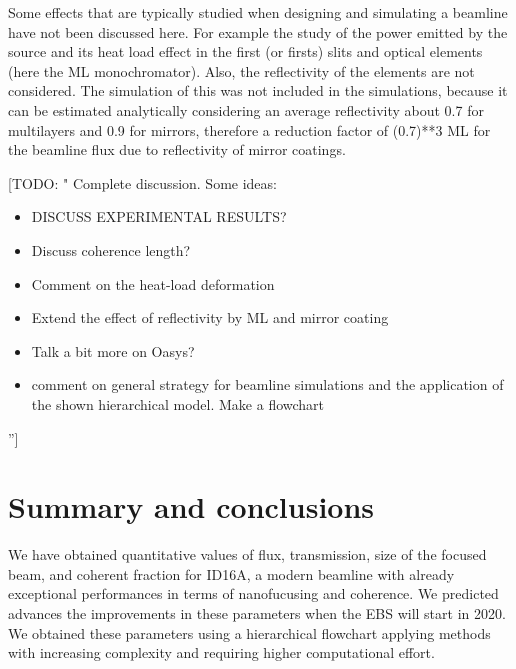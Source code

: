 \documentclass{iucr}              %
\newcommand{\todo}[1]{{\color{red}[TODO: "#1'']}}
\newcommand{\inred}[1]{{\color{red}#1}}
\begin{document}
Some effects that are typically studied when designing and simulating a beamline have not been discussed here. For example the study of the power emitted by the source and its heat load effect in the first (or firsts) slits and optical elements (here the ML monochromator). Also, the reflectivity of the elements are not considered. The simulation of this was not included in the simulations, because it can be estimated analytically considering an average reflectivity about \inred{0.7 for multilayers and 0.9 for mirrors, therefore a reduction factor of (0.7)**3 ML for the beamline flux due to reflectivity of mirror coatings}. 

\todo{
Complete discussion. Some ideas:
\begin{itemize}
 \item DISCUSS EXPERIMENTAL RESULTS?
 \item Discuss coherence length?
 \item Comment on the heat-load deformation 
 \item Extend the effect of reflectivity by ML and mirror coating
 \item Talk a bit more on Oasys?
 \item comment on general strategy for beamline simulations and the application of the shown hierarchical model. Make a flowchart
\end{itemize}
 }


\section{Summary and conclusions}

We have obtained quantitative values of flux, transmission, size of the focused beam, and coherent fraction for ID16A, a modern beamline with already exceptional performances in terms of nanofucusing and coherence. We predicted advances the improvements in these parameters when the EBS will start in 2020. We obtained these parameters using a hierarchical flowchart applying methods with increasing complexity and requiring higher computational effort. 
\end{document}
